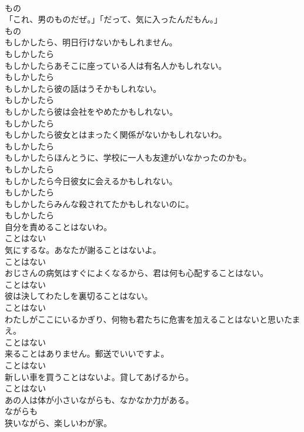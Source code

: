 \documentclass[8pt]{extreport}
\begin{document}
\begin{CJK}{UTF8}{min}
\\	もの	
\\	「これ、男のものだぜ。」「だって、気に入ったんだもん。」	
\\	もの	
\\	もしかしたら、明日行けないかもしれません。	
\\	もしかしたら	
\\	もしかしたらあそこに座っている人は有名人かもしれない。	
\\	もしかしたら	
\\	もしかしたら彼の話はうそかもしれない。	
\\	もしかしたら	
\\	もしかしたら彼は会社をやめたかもしれない。	
\\	もしかしたら	
\\	もしかしたら彼女とはまったく関係がないかもしれないわ。	
\\	もしかしたら	
\\	もしかしたらほんとうに、学校に一人も友達がいなかったのかも。	
\\	もしかしたら	
\\	もしかしたら今日彼女に会えるかもしれない。	
\\	もしかしたら	
\\	もしかしたらみんな殺されてたかもしれないのに。	
\\	もしかしたら	
\\	自分を責めることはないわ。	
\\	ことはない	
\\	気にするな。あなたが謝ることはないよ。	
\\	ことはない	
\\	おじさんの病気はすぐによくなるから、君は何も心配することはない。	
\\	ことはない	
\\	彼は決してわたしを裏切ることはない。	
\\	ことはない	
\\	わたしがここにいるかぎり、何物も君たちに危害を加えることはないと思いたまえ。	
\\	ことはない	
\\	来ることはありません。郵送でいいですよ。	
\\	ことはない	
\\	新しい車を買うことはないよ。貸してあげるから。	
\\	ことはない	
\\	あの人は体が小さいながらも、なかなか力がある。	
\\	ながらも	
\\	狭いながら、楽しいわが家。	

\end{CJK}
\end{document}
